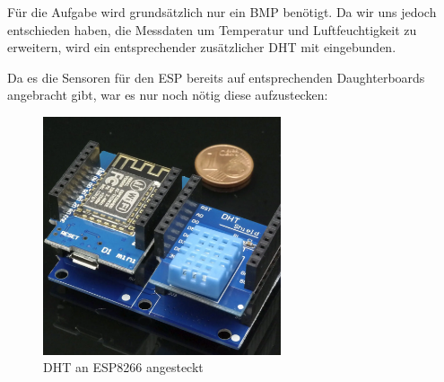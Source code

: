 Für die Aufgabe wird grundsätzlich nur ein BMP benötigt.
Da wir uns jedoch entschieden haben, die Messdaten um Temperatur und Luftfeuchtigkeit zu erweitern, 
wird ein entsprechender zusätzlicher DHT mit eingebunden.

Da es die Sensoren für den ESP bereits auf entsprechenden Daughterboards angebracht gibt,
war es nur noch nötig diese aufzustecken:

\begin{figure}[h]
	\centering
	\includegraphics[width=7cm]{images/esp_dht.png}
	\caption[dht\_an\_esp]{DHT an ESP8266 angesteckt}
	\label{fig:dht_an_esp}
\end{figure}